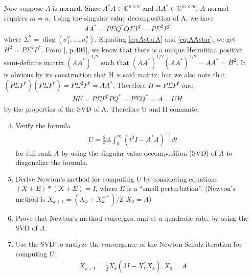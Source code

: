 \documentclass{article}
\DeclareMathOperator{\diag}{diag}
\begin{document}
Now suppose $A$ is normal. Since $A^*A \in \mathbb{C}^{n\times n}$ and
$AA^* \in \mathbb{C}^{m \times m}$, $A$ normal requires $m=n$.
Using the singular value decomposition of A, we have
\begin{align}
	AA^* = P\Sigma Q^* Q\Sigma P^* = P\Sigma^2 P^*
	\label{eq:AAstar}
\end{align}
where $\Sigma^2 = \diag(\sigma_1^2, \ldots,\sigma_r^2)$.
Equating \ref{eq:AstarA} and \ref{eq:AAstar}, we get 
$H^2 = P\Sigma^2P^*$. From [\cite{hojo85}, p.405], we know that there
is a unique Hermitian positive semi-definite matrix $(AA^*)^{1/2}$ such 
that $(AA^*)^{1/2}(AA^*)^{1/2} = AA^* = H^2$.
It is obvious by its construction that H is said matrix, but we also
note that $(P\Sigma P^*) (P\Sigma P^*) = P \Sigma^2P^* = AA^*$.
Therefore $H = P\Sigma P^*$ and
\begin{align}
	HU = P\Sigma P^* PQ^* = P \Sigma Q^* = A = UH
\end{align}
by the properties of the SVD of A. Therefore U and H commute.
 

\begin{enumerate}
	\setcounter{enumi}{3}
	\item Verify the formula
	\begin{align*}
		U = \frac{2}{\pi}A \int_{0}^{\infty} (t^2I - A^*A)^{-1}dt
	\end{align*}
	for full rank $A$ by using the singular value decomposition (SVD)
	of $A$ to diagonalize the formula.
\end{enumerate}



\begin{enumerate}
	\setcounter{enumi}{4}
	\item Derive Newton's method for computing U by considering
	equations $(X+E)*(X+E) = I$, where $E$ is a ``small perturbation''.
	(Newton's method is $X_{k+1} = (X_k + X_k^{-*})/2, X_0 = A$)
\end{enumerate}



\begin{enumerate}
	\setcounter{enumi}{5}
	\item Prove that Newton's method converges, and at a quadratic
	rate, by using the SVD of $A$.
\end{enumerate}



\begin{enumerate}
	\setcounter{enumi}{6}
	\item Use the SVD to analyze the convergence of the
	Newton\nobreakdash-Schulz iteration for computing $U$:
	\begin{align*}
		X_{k+1} = \frac{1}{2}X_k(3I - X_k^* X_k), X_0 = A
	\end{align*}
\end{enumerate}
\end{document}
